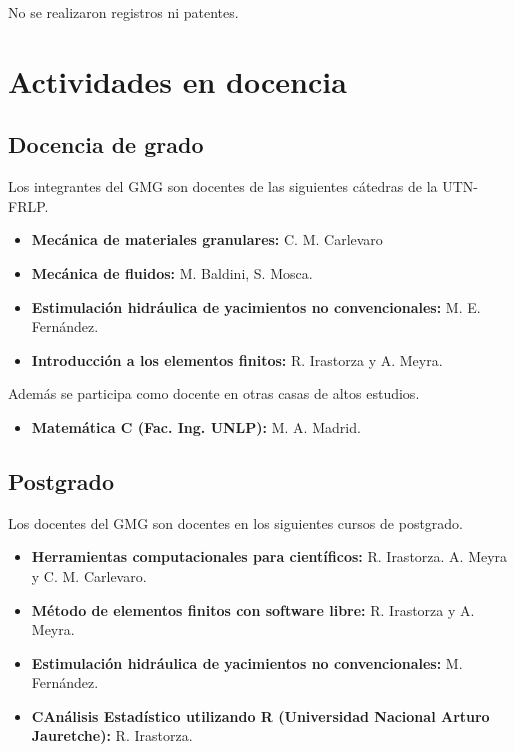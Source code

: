\documentclass[a4paper,11pt,twoside,final,titlepage,onecolumn,openright]{report}
\begin{document}
No se realizaron registros ni patentes.



\chapter{Actividades en docencia}

\section{Docencia de grado}

Los integrantes del GMG son docentes de las siguientes cátedras de la UTN-FRLP.

\begin{itemize}
 \item {\bf Mecánica de materiales granulares:} C. M. Carlevaro
 \item {\bf Mecánica de fluidos:} M. Baldini, S. Mosca.
 \item {\bf Estimulación hidráulica de yacimientos no convencionales:} M. E. Fernández.
 \item {\bf Introducción a los elementos finitos:} R. Irastorza y A. Meyra.
\end{itemize}

Además se participa como docente en otras casas de altos estudios.

\begin{itemize}
 \item {\bf Matemática C (Fac. Ing. UNLP):} M. A. Madrid.
\end{itemize}


\section{Postgrado}

Los docentes del GMG son docentes en los siguientes cursos de postgrado.

\begin{itemize}
 \item {\bf Herramientas computacionales para científicos:} R. Irastorza. A. Meyra y C. M. Carlevaro.
 \item \textbf{Método de elementos finitos con software libre:} R. Irastorza y A. Meyra.
 \item \textbf{Estimulación hidráulica de yacimientos no convencionales:} M. Fernández.
 \item {\bf CAnálisis Estadístico utilizando R (Universidad Nacional Arturo Jauretche):} R. Irastorza.

\end{itemize}
\end{document}
